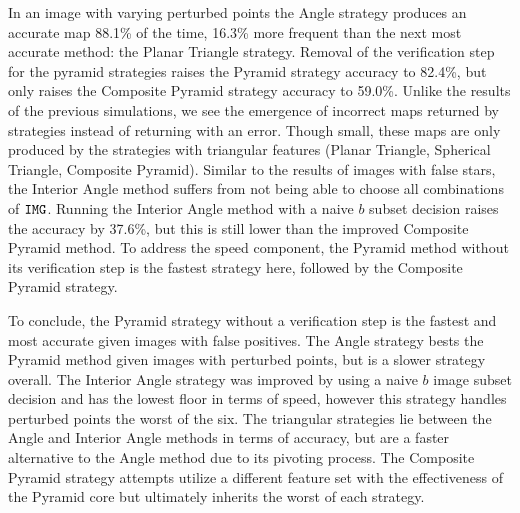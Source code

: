In an image with varying perturbed points the Angle strategy produces an accurate map 88.1\% of the time, 16.3\% more frequent than the next most accurate method: the Planar Triangle strategy.
Removal of the verification step for the pyramid strategies raises the Pyramid strategy accuracy to 82.4\%, but only raises the Composite Pyramid strategy accuracy to 59.0\%.
Unlike the results of the previous simulations, we see the emergence of incorrect maps returned by strategies instead of returning with an error.
Though small, these maps are only produced by the strategies with triangular features (Planar Triangle, Spherical Triangle, Composite Pyramid).
Similar to the results of images with false stars, the Interior Angle method suffers from not being able to choose all combinations of $\texttt{IMG}$.
Running the Interior Angle method with a naive $b$ subset decision  raises the accuracy by 37.6\%, but this is still lower than the improved Composite Pyramid method.
To address the speed component, the Pyramid method without its verification step is the fastest strategy here, followed by the Composite Pyramid strategy.

To conclude, the Pyramid strategy without a verification step is the fastest and most accurate given images with false positives.
The Angle strategy bests the Pyramid method given images with perturbed points, but is a slower strategy overall.
The Interior Angle strategy was improved by using a naive $b$ image subset decision and has the lowest floor in terms of speed, however this strategy handles perturbed points the worst of the six. 
The triangular strategies lie between the Angle and Interior Angle methods in terms of accuracy, but are a faster alternative to the Angle method due to its pivoting process.
The Composite Pyramid strategy attempts utilize a different feature set with the effectiveness of the Pyramid core but ultimately inherits the worst of each strategy.


\begin{figure}
\end{figure}

